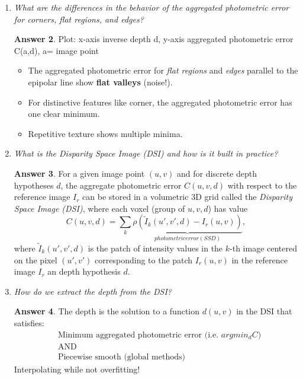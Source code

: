 \documentclass[a4paper,12 pt]{article}
\theoremstyle{definition}
\theoremstyle{remark}
\theoremstyle{definition}
\theoremstyle{definition}
\theoremstyle{definition}
\theoremstyle{definition}
\theoremstyle{remark}
\theoremstyle{remark}
\theoremstyle{definition}
\theoremstyle{definition}
\newtheorem*{answer}{Answer}
\begin{document}
\begin{enumerate}
\begin{answer}
\end{answer}
\item \textit{What are the differences in the behavior of the aggregated photometric error for corners, flat regions, and edges?}
\begin{answer}
Plot: x-axis inverse depth d, y-axis aggregated photometric error C(a,d), a= image point
\begin{itemize}
\item The aggregated photometric error for \textit{flat regions} and \textit{edges} parallel to the epipolar line show \textbf{flat valleys} (noise!).
\item For distinctive features like corner, the aggregated photometric error has one clear minimum.
\item Repetitive texture shows multiple minima.
\end{itemize}
\end{answer}

\item \textit{What is the Disparity Space Image (DSI) and how is it built in practice? }
\begin{answer}
For a given image point $(u,v)$ and for discrete depth hypotheses $d$, the aggregate photometric error $C(u,v,d)$ with respect to the reference image $I_r$ can be stored in a volumetric 3D grid called the \textit{Disparity Space Image (DSI)}, where each voxel (group of $u,v,d$) has value
\begin{equation}
C(u,v,d)=\sum_{k}\underbrace{\rho \left( \tilde{I}_k (u',v',d)-I_r(u,v)\right)}_{photometric error (SSD)},
\end{equation}
where $\tilde{I}_k (u',v',d)$ is the patch of intensity values in the $k$-th image centered on the pixel $(u',v')$ corresponding to the patch $I_r(u,v)$ in the reference image $I_r$ an depth hypothesis $d$. 
\end{answer}

\item \textit{ How do we extract the depth from the DSI?}
\begin{answer}
The depth is the solution to a function $d(u,v)$ in the DSI that satisfies:
\begin{equation}
\begin{split}
&\text{Minimum aggregated photometric error (i.e. } argmin_d C)\\
& \text{AND}\\
& \text{Piecewise smooth (global methods)}
\end{split}
\end{equation}
Interpolating while not overfitting!\\


\end{answer}
\end{enumerate}
\end{document}
